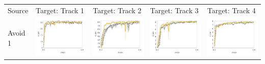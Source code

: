 \begin{table}
     \begin{tabular}{m{} >{\centering}m{} >{\centering}m{} >{\centering}m{} >{\centering\arraybackslash}m{} }
	Source & Target: Track 1 & Target: Track 2 & Target: Track 3 & Target: Track 4  \\
     	
	Avoid 1 &
        \includegraphics[width=.22\textwidth]{figures/app_plots/lab/sa1/seek_track_01} &
        \includegraphics[width=.22\textwidth]{figures/app_plots/lab/sa1/seek_track_02} &
        \includegraphics[width=.22\textwidth]{figures/app_plots/lab/sa1/seek_track_03} &
        \includegraphics[width=.22\textwidth]{figures/app_plots/lab/sa1/seek_track_04} \\


\end{tabular}
\end{table}
